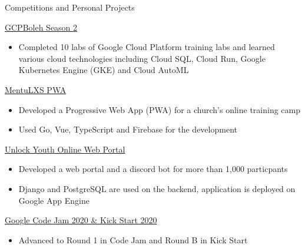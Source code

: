 \documentclass{article}
\newlength{\tabin}
\newlength{\secsep}
\newcommand{\lineunder}{\vspace*{-8pt} \\ \hspace*{-6pt} \hrulefill \\ \vspace*{-15pt}}
\newenvironment{tabbedsection}[1]{
  \begin{list}{}{
      \setlength{\itemsep}{0pt}
      \setlength{\labelsep}{0pt}
      \setlength{\labelwidth}{0pt}
      \setlength{\leftmargin}{\tabin}
      \setlength{\rightmargin}{\tabin}
      \setlength{\listparindent}{0pt}
      \setlength{\parsep}{0pt}
      \setlength{\parskip}{0pt}
      \setlength{\partopsep}{0pt}
      \setlength{\topsep}{#1}
    }
  \item[]
}{\end{list}}
\newenvironment{resume_section}[1]{
  \filbreak
  \vspace{2\secsep}
  \textsc{\large#1}
  \lineunder
  \begin{tabbedsection}{\secsep}
}{\end{tabbedsection}}
\newenvironment{resume_subsection}[2][]{
  \textbf{#2} \hfill {\footnotesize #1} \hspace{2em}
  \begin{tabbedsection}{0.5\secsep}
}{\end{tabbedsection}}
\newenvironment{subitems}{
  \renewcommand{\labelitemi}{-}
  \begin{itemize}
      \setlength{\labelsep}{1em}
}{\end{itemize}}
\begin{document}
\begin{resume_section}{Competitions and Personal Projects}
  \begin{resume_subsection}{\href{https://www.qwiklabs.com/public_profiles/d668c6be-b102-411f-8c49-512de455899f}{GCPBoleh Season 2}}
    \begin{subitems}
      \item Completed 10 labs of Google Cloud Platform training labs and learned various cloud technologies including Cloud SQL, Cloud Run, Google Kubernetes Engine (GKE) and Cloud AutoML
    \end{subitems}
  \end{resume_subsection}

  \begin{resume_subsection}[(August 2021)]{\href{https://github.com/marcustut/mentu-lxs}{MentuLXS PWA}}
    \begin{subitems}
      \item Developed a Progressive Web App (PWA) for a church's online training camp
      \item Used Go, Vue, TypeScript and Firebase for the development
    \end{subitems}
  \end{resume_subsection}

  \begin{resume_subsection}{\href{https://github.com/marcustut/UnlockProject}{Unlock Youth Online Web Portal}}
    \begin{subitems}
      \item Developed a web portal and a discord bot for more than 1,000 particpants
      \item Django and PostgreSQL are used on the backend, application is deployed on Google App Engine
    \end{subitems}
  \end{resume_subsection}

  \begin{resume_subsection}{\href{https://drive.google.com/drive/folders/1PXG8UBWxGFG66U_oSWwOouJDr8cWGGAu?usp=sharing}{Google Code Jam 2020 \& Kick Start 2020}}
    \begin{subitems}
      \item Advanced to Round 1 in Code Jam and Round B in Kick Start
    \end{subitems}
  \end{resume_subsection}
\end{resume_section}
\end{document}
